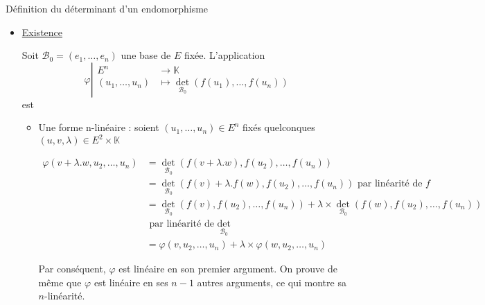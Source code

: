 \documentclass{article}
\begin{document}
\begin{question_kholle}[{
    Soit $E$ un $\mathbb{K}$-espace vectoriel de dimension finie et $F \in \mathcal{L}_{\mathbb{K}}(E)$
    $$\exists!\lambda \in \mathbb{K} : \forall \mathcal{B} \text{ base de }E, \forall (u_{1}, \dots, u_{n})\in E^{n}, \det_{\mathcal{B}}(f(u_{1}), \dots, f(u_{n}))=\lambda \times \det_{\mathcal{B}}(u_{1}, \dots, u_{n})$$
    On appelle ce $\lambda$ \underline{le} déterminant de l'endomorphisme $f$.
}]{Définition du déterminant d'un endomorphisme}
    
\begin{itemize}[label=$\lozenge$]
    \item \underline{Existence}

Soit $\mathcal{B}_{0}= (e_{1}, \dots, e_{n})$ une base de $E$ fixée.
L'application
$$
\varphi \left|\begin{array}{ll} E^{n} &\to \mathbb{K} \\ (u_{1}, \dots, u_{n}) &\mapsto \det_{\mathcal{B}_{0}}(f(u_{1}), \dots, f(u_{n})) \end{array}\right.
$$
est
\begin{itemize}
    \item Une forme n-linéaire :  soient $(u_{1}, \dots, u_{n}) \in E^{n}$ fixés quelconques $(u, v, \lambda) \in E^{2} \times \mathbb{K}$

\begin{align*}
\varphi (v+\lambda.w, u_{2}, \dots, u_{n})  & = \det_{\mathcal{B}_{0}}(f(v+\lambda.w), f(u_{2}), \dots, f(u_{n})) \\
&= \det_{\mathcal{B}_{0}}(f(v)+ \lambda.f(w), f(u_{2}), \dots, f(u_{n})) \text{ par linéarité de }f\\
&= \det_{\mathcal{B}_{0}}(f(v), f(u_{2}), \dots, f(u_{n})) + \lambda \times \det_{\mathcal{B}_{0}}(f(w), f(u_{2}), \dots, f(u_{n}))\\
& \text{ par linéarité de } \det_{\mathcal{B}_{0}} \\
&= \varphi(v, u_{2}, \dots, u_{n})+ \lambda \times \varphi(w, u_{2}, \dots, u_{n})
\end{align*}

Par conséquent, $\varphi$ est linéaire en son premier argument.
On prouve de même que $\varphi$ est linéaire en ses $n-1$ autres arguments, ce qui montre sa $n$-linéarité.


\end{itemize}
\end{itemize}
\end{question_kholle}
\end{document}
